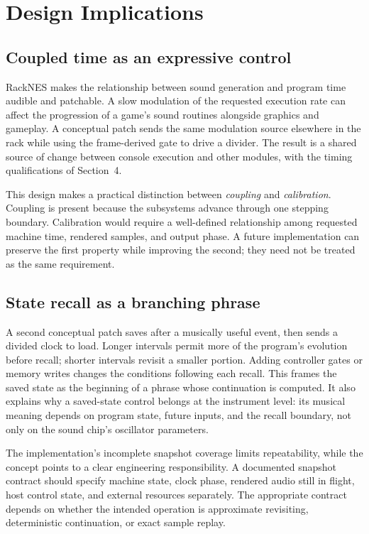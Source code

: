 \documentclass[10pt,letterpaper,twocolumn]{article}
\begin{document}
\section{Design Implications}
\subsection{Coupled time as an expressive control}
RackNES makes the relationship between sound generation and program time
audible and patchable. A slow modulation of the requested execution rate can
affect the progression of a game's sound routines alongside graphics and
gameplay. A conceptual patch sends the same modulation source elsewhere in
the rack while using the frame-derived gate to drive a divider. The result is
a shared source of change between console execution and other modules, with
the timing qualifications of Section~4.

This design makes a practical distinction between \emph{coupling} and
\emph{calibration}. Coupling is present because the subsystems advance through
one stepping boundary. Calibration would require a well-defined relationship
among requested machine time, rendered samples, and output phase. A future
implementation can preserve the first property while improving the second;
they need not be treated as the same requirement.

\subsection{State recall as a branching phrase}
A second conceptual patch saves after a musically useful event, then sends a
divided clock to load. Longer intervals permit more of the program's evolution
before recall; shorter intervals revisit a smaller portion. Adding controller
gates or memory writes changes the conditions following each recall. This
frames the saved state as the beginning of a phrase whose continuation is
computed. It also explains why a saved-state control belongs at the instrument
level: its musical meaning depends on program state, future inputs, and the
recall boundary, not only on the sound chip's oscillator parameters.

The implementation's incomplete snapshot coverage limits repeatability, while
the concept points to a clear engineering responsibility. A documented snapshot
contract should specify machine state, clock phase, rendered audio still in
flight, host control state, and external resources separately. The appropriate
contract depends on whether the intended operation is approximate revisiting,
deterministic continuation, or exact sample replay.
\end{document}
